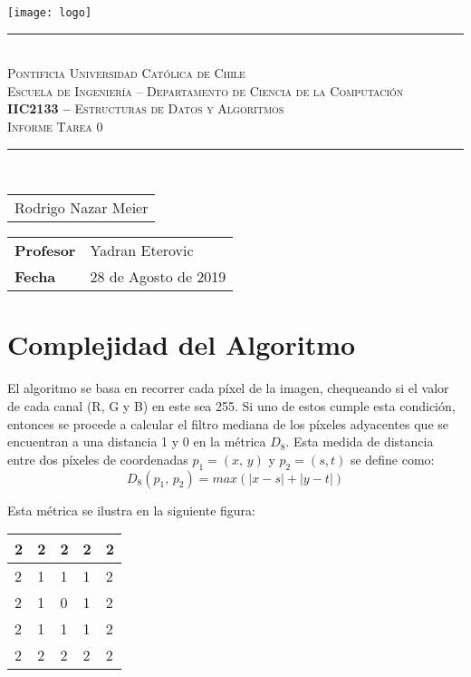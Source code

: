 \documentclass[11pt]{article}
\begin{document}
	\thispagestyle{empty}
	\begin{center}
		\texttt{[image: logo]}\\\large
		\rule[1.75ex]{3in}{0.6pt}\\\vspace{-1.2ex}
		\scshape Pontificia Universidad Católica de Chile\\Escuela de Ingeniería -- Departamento de Ciencia de la Computación\\\vspace{10pc}
		\normalfont\large\sffamily\textbf{IIC2133 --} Estructuras de Datos y Algoritmos\\
		\normalfont\Huge\scshape
		Informe Tarea 0
		\rule[1em]{\linewidth}{2pt}\\\vspace{-1.2ex}
	\end{center}\vspace{2pc}
	\begin{center}\sffamily\begin{tabular}{l}
		\large
		Rodrigo Nazar Meier
		\end{tabular}
	\end{center}
	\vspace{14pc}
	\begin{tabular}{@{}ll}
		\textbf{Profesor}&Yadran Eterovic\\
		\textbf{Fecha}&28 de Agosto de 2019
	\end{tabular}
	\newpage
	\section{Complejidad del Algoritmo}
	
	El algoritmo se basa en recorrer cada píxel de la imagen, chequeando si el valor de cada canal (R, G y B) en este sea 255. Si uno de estos cumple esta condición, entonces se procede a calcular el filtro mediana de los píxeles adyacentes que se encuentran a una distancia 1 y 0 en la métrica $D_8$. Esta medida de distancia entre dos píxeles de coordenadas $p_1 = (x,\, y)$ y $p_2 = (s, t)$ se define como: $$D_8(p_1,\,p_2) = max(|x-s| + |y-t|)$$
	
	Esta métrica se ilustra en la siguiente figura:
	
	\begin{table}[h]\centering
		\begin{tabular}{|l|l|l|l|l|}
			\hline
			2 & 2 & 2 & 2 & 2 \\
			\hline
			2& 1 & 1 & 1 & 2 \\
			\hline
			2& 1 & 0 & 1 & 2 \\
			\hline
			2& 1 & 1 & 1 & 2 \\
			\hline
			2& 2 & 2 & 2 & 2 \\
			\hline
		\end{tabular}
	\end{table}
	
\end{document}
